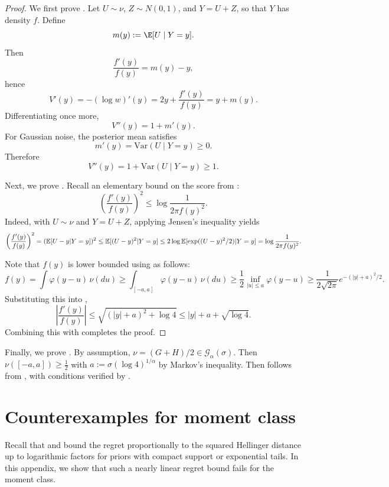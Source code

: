 \documentclass[letterpaper,11pt]{article}
\def\exp{\mathop{\rm exp}}
\def\Var{\mathrm{Var}}
\newcommand{\Expect}{\mathbb{E}}
\newcommand{\pth}[1]{\left( #1 \right)}
\newcommand{\calG}{{\mathcal{G}}}
\theoremstyle{definition}
\begin{document}
\begin{proof}
We first prove .
Let $U\sim \nu$, $Z\sim N(0,1)$, and $Y=U+Z$, so that $Y$ has density $f$. Define
\[
m(y):=\E[U\mid Y=y].
\]
Then
\[
\frac{f'(y)}{f(y)}=m(y)-y,
\]
hence
\begin{equation}
    V'(y)=-(\log w)'(y)=2y+\frac{f'(y)}{f(y)}=y+m(y).
    \label{eq:Vp-upper}
\end{equation}
Differentiating once more,
\[
V''(y)=1+m'(y).
\]
For Gaussian noise, the posterior mean satisfies
\[
m'(y)=\Var(U\mid Y=y)\ge 0.
\]
Therefore
\[
V''(y)=1+\Var(U\mid Y=y)\ge 1.
\]

Next, we prove . Recall an elementary bound on the score from \cite[Lemma A.1]{JiangZhang2009}:
\begin{equation}
\left(\frac{f'(y)}{f(y)}\right)^2
\le
\log\frac{1}{2\pi f(y)^2}.
\label{eq:JZ}
\end{equation}
Indeed, with $U\sim \nu$ and $Y=U+Z$, applying Jensen's inequality yields
\[
\pth{\frac{f'(y)}{f(y)}}^2
=(\Expect[U-y|Y=y])^2
\leq \Expect[(U-y)^2|Y=y]
\leq 2 \log \Expect[\exp((U-y)^2/2)|Y=y]
= \log\frac{1}{2\pi f(y)^2}.
\]


Note that $f(y)$ is lower bounded using   as follows:
\[
    f(y)
=
\int \varphi(y-u)\,\nu(du)
\ge
\int_{[-a,a]} \varphi(y-u)\,\nu(du)
\ge
\frac12 \inf_{|u|\le a}\varphi(y-u)
\geq \frac{1}{2\sqrt{2\pi}}e^{-(|y|+a)^2/2}.
\]
Substituting this into ,
\[
\left|\frac{f'(y)}{f(y)}\right|
\le
\sqrt{(|y|+a)^2+\log 4}
\le
|y|+a+\sqrt{\log 4}.
\]
Combining this with  completes the proof.
\end{proof}

Finally, we prove . By assumption, $\nu = (G+H)/2 \in \calG_\alpha(\sigma)$. Then
$\nu([-a,a])\geq \frac12$ with $a:=\sigma (\log 4)^{1/\alpha}$ by Markov's inequality. Then  follows from , with conditions verified by .



\section{Counterexamples for moment class}
\label{app:moment}
Recall that  and  bound the regret proportionally to the squared Hellinger distance up to logarithmic factors for priors with compact support or exponential tails.
In this appendix, we show that such a
nearly linear regret bound fails for the moment class.
\end{document}
